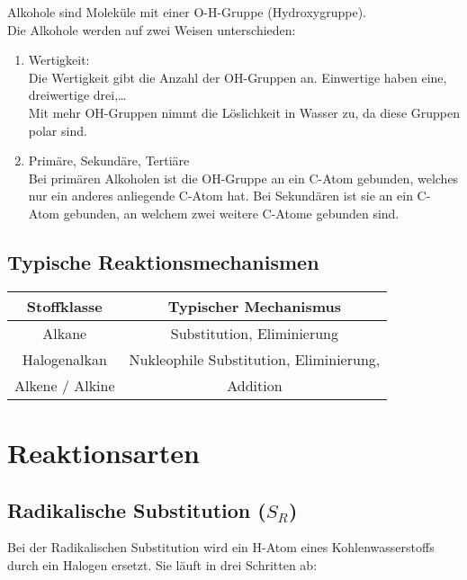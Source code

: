 \documentclass[a4paper]{article}
\begin{document}
Alkohole sind Moleküle mit einer O-H-Gruppe (Hydroxygruppe).\\
Die Alkohole werden auf zwei Weisen unterschieden:
\begin{enumerate}
    \item Wertigkeit:\\
            Die Wertigkeit gibt die Anzahl der OH-Gruppen an. Einwertige haben eine, dreiwertige drei,\dots\\
            Mit mehr OH-Gruppen nimmt die Löslichkeit in Wasser zu, da diese Gruppen polar sind.
    \item Primäre, Sekundäre, Tertiäre\\
            Bei primären Alkoholen ist die OH-Gruppe an ein C-Atom gebunden, welches nur ein anderes anliegende C-Atom hat.
            Bei Sekundären ist sie an ein C-Atom gebunden, an welchem zwei weitere C-Atome gebunden sind.\\
\end{enumerate}


\subsection{Typische Reaktionsmechanismen}
\begin{tabular}{|c|c|} \hline
    Stoffklasse &Typischer Mechanismus \\\hline
    Alkane &Substitution, Eliminierung\\
    Halogenalkan &Nukleophile Substitution, Eliminierung,\\
    Alkene / Alkine &Addition\\\hline
\end{tabular}




\section{Reaktionsarten}

\subsection{Radikalische Substitution ($S_R$)}

Bei der Radikalischen Substitution wird ein H-Atom eines Kohlenwasserstoffs durch ein Halogen ersetzt.
Sie läuft in drei Schritten ab:\\
\end{document}

